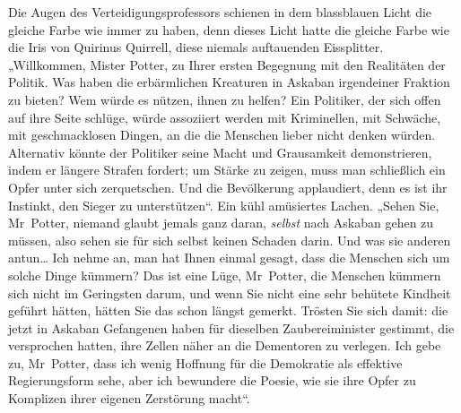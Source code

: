 Die Augen des Verteidigungsprofessors schienen in dem blassblauen Licht die gleiche Farbe wie immer zu haben, denn dieses Licht hatte die gleiche Farbe wie die Iris von Quirinus Quirrell, diese niemals auftauenden Eissplitter. „Willkommen, Mister Potter, zu Ihrer ersten Begegnung mit den Realitäten der Politik. Was haben die erbärmlichen Kreaturen in Askaban irgendeiner Fraktion zu bieten? Wem würde es nützen, ihnen zu helfen? Ein Politiker, der sich offen auf ihre Seite schlüge, würde assoziiert werden mit Kriminellen, mit Schwäche, mit geschmacklosen Dingen, an die die Menschen lieber nicht denken würden. Alternativ könnte der Politiker seine Macht und Grausamkeit demonstrieren, indem er längere Strafen fordert; um Stärke zu zeigen, muss man schließlich ein Opfer unter sich zerquetschen. Und die Bevölkerung applaudiert, denn es ist ihr Instinkt, den Sieger zu unterstützen“. Ein kühl amüsiertes Lachen. „Sehen Sie, Mr~Potter, niemand glaubt jemals ganz daran, \emph{selbst} nach Askaban gehen zu müssen, also sehen sie für sich selbst keinen Schaden darin. Und was sie anderen antun… Ich nehme an, man hat Ihnen einmal gesagt, dass die Menschen sich um solche Dinge kümmern? Das ist eine Lüge, Mr~Potter, die Menschen kümmern sich nicht im Geringsten darum, und wenn Sie nicht eine sehr behütete Kindheit geführt hätten, hätten Sie das schon längst gemerkt. Trösten Sie sich damit: die jetzt in Askaban Gefangenen haben für dieselben Zaubereiminister gestimmt, die versprochen hatten, ihre Zellen näher an die Dementoren zu verlegen. Ich gebe zu, Mr~Potter, dass ich wenig Hoffnung für die Demokratie als effektive Regierungsform sehe, aber ich bewundere die Poesie, wie sie ihre Opfer zu Komplizen ihrer eigenen Zerstörung macht“.

